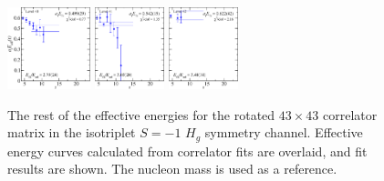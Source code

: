 \begin{figure}[H]
    \\[-0.5cm]
    \includegraphics[width=0.215\textwidth]{figures/sigmas/hg/fits/fit_36.pdf}
    \includegraphics[width=0.18\textwidth]{figures/sigmas/hg/fits/fit_37.pdf}
    \includegraphics[width=0.18\textwidth]{figures/sigmas/hg/fits/fit_41.pdf}
    \caption[The rest of the effective energies for the rotated $43\times 43$ correlator matrix in the isotriplet $S=-1$ $H_g$ symmetry channel.]{The rest of the effective energies for the rotated $43\times 43$ correlator matrix in the isotriplet $S=-1$ $H_g$ symmetry channel. Effective energy curves calculated from correlator fits are overlaid, and fit results are shown. The nucleon mass is used as a reference.}\label{fig:hg_fits2}
\end{figure}

